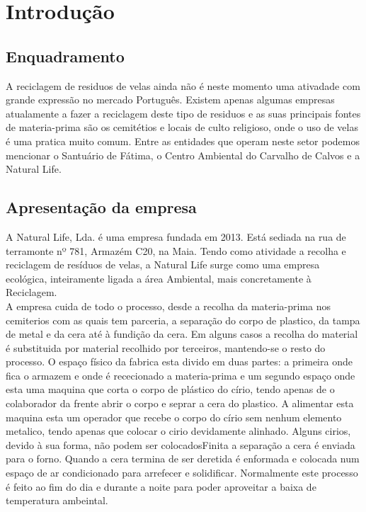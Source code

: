 \chapter{Introdução}
\label{cap:1}

\section{Enquadramento}
A reciclagem de residuos de velas ainda não é neste momento uma ativadade com grande expressão no mercado Português. Existem apenas algumas empresas atualamente a fazer a reciclagem deste tipo de residuos e as suas principais fontes de materia-prima são os cemitétios e locais de culto religioso, onde o uso de velas é uma pratica muito comum. Entre as entidades que operam neste setor podemos mencionar o Santuário de Fátima\cite{DesktakFatima}, o Centro Ambiental do Carvalho de Calvos\cite{SecundinoCunha2016} e a Natural Life\cite{NaturalLife}.

\section{Apresentação da empresa}
A Natural Life, Lda. é uma empresa fundada em 2013. Está sediada na rua de terramonte nº 781, Armazém C20, na Maia. Tendo como atividade a recolha e reciclagem de resíduos de velas, a Natural Life surge como uma empresa ecológica, inteiramente ligada a área Ambiental, mais concretamente à Reciclagem.\cite{NaturalLife}\\
A empresa cuida de todo o processo, desde a recolha da materia-prima nos cemiterios com as quais tem parceria, a separação do corpo de plastico, da tampa de metal e da cera até à fundição da cera. Em alguns casos a recolha do material é substituida por material recolhido por terceiros, mantendo-se o resto do processo.
O espaço físico da fabrica esta divido em duas partes: a primeira onde fica o armazem e onde é rececionado a materia-prima e um segundo espaço onde esta uma maquina que corta o corpo de plástico do círio, tendo apenas de o colaborador da frente abrir o corpo e seprar a cera do plastico. A alimentar esta maquina esta um operador que recebe o corpo do círio sem nenhum elemento metalico, tendo apenas que colocar o cirio devidamente alinhado. Alguns cirios, devido à sua forma, não podem ser colocadosFinita a separação a cera é enviada para o forno. Quando a cera termina de ser deretida é enformada e colocada num espaço de ar condicionado para arrefecer e solidificar. Normalmente este processo é feito ao fim do dia e durante a noite para poder aproveitar a baixa de temperatura ambeintal.

